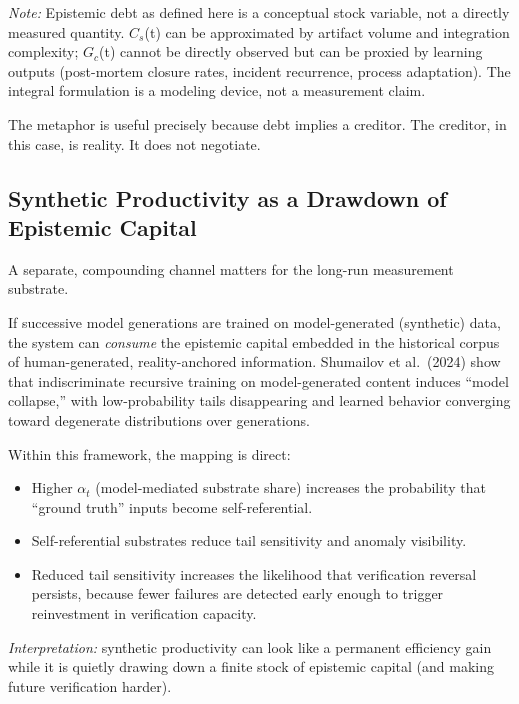 \documentclass[11pt,a4paper]{article}
\providecommand{\tightlist}{\setlength{\itemsep}{0pt}\setlength{\parskip}{0pt}}
\begin{document}
\emph{Note:} Epistemic debt as defined here is a conceptual stock variable, not a directly measured quantity. $C_s$(t) can be approximated by artifact volume and integration complexity; $G_c$(t) cannot be directly observed but can be proxied by learning outputs (post-mortem closure rates, incident recurrence, process adaptation). The integral formulation is a modeling device, not a measurement claim.

The metaphor is useful precisely because debt implies a creditor. The creditor, in this case, is reality. It does not negotiate.

\hypertarget{synthetic-productivity-as-a-drawdown-of-epistemic-capital}{%
\subsection{ Synthetic Productivity as a Drawdown of Epistemic Capital}\label{synthetic-productivity-as-a-drawdown-of-epistemic-capital}}

A separate, compounding channel matters for the long-run measurement substrate.

If successive model generations are trained on model-generated (synthetic) data, the system can \emph{consume} the epistemic capital embedded in the historical corpus of human-generated, reality-anchored information. Shumailov et al.~(2024) show that indiscriminate recursive training on model-generated content induces ``model collapse,'' with low-probability tails disappearing and learned behavior converging toward degenerate distributions over generations.

Within this framework, the mapping is direct:

\begin{itemize}
\tightlist
\item
  Higher $\alpha_{t}$ (model-mediated substrate share) increases the probability that ``ground truth'' inputs become self-referential.
\item
  Self-referential substrates reduce tail sensitivity and anomaly visibility.
\item
  Reduced tail sensitivity increases the likelihood that verification reversal persists, because fewer failures are detected early enough to trigger reinvestment in verification capacity.
\end{itemize}

\emph{Interpretation:} synthetic productivity can look like a permanent efficiency gain while it is quietly drawing down a finite stock of epistemic capital (and making future verification harder).
\end{document}
